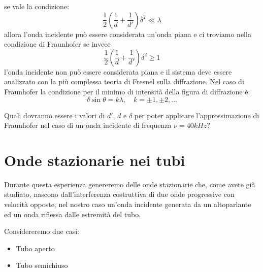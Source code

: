 \documentclass[a4paper,10pt,oneside]{article}
\begin{document}
se vale la condizione:
\begin{equation}
 \frac 1 2 \left(\frac{1}{d}+\frac{1}{d'}\right)\delta^2\ll \lambda
\end{equation}
allora l'onda incidente può essere considerata un'onda piana e ci troviamo nella condizione di Fraunhofer se invece
\begin{equation}
 \frac 1 2 \left(\frac{1}{d}+\frac{1}{d'}\right)\delta^2\geq 1
\end{equation}
l'onda incidente non può essere considerata piana e il sistema deve essere analizzato con la più complessa teoria di Fresnel sulla diffrazione. Nel caso di Fraunhofer la condizione per il minimo di intensità della figura di diffrazione è:
\begin{equation}
 \delta \sin\theta=k\lambda,\quad k=\pm 1,\pm 2,\ldots
\end{equation}

Quali dovranno essere i valori di $d'$, $d$ e $\delta$ per poter applicare l'approssimazione di Fraunhofer nel caso di un onda incidente di frequenza $\nu=40kHz$? 


\section*{Onde stazionarie nei tubi}

Durante questa esperienza genereremo delle onde stazionarie che, come avete già studiato, nascono dall'interferenza costruttiva di due onde progressive con velocità opposte, nel nostro caso un'onda incidente generata da un altoparlante ed un onda riflessa dalle estremità del tubo.

Considereremo due casi:
\begin{itemize}
 \item Tubo aperto
\item Tubo semichiuso
\end{itemize}
\end{document}
